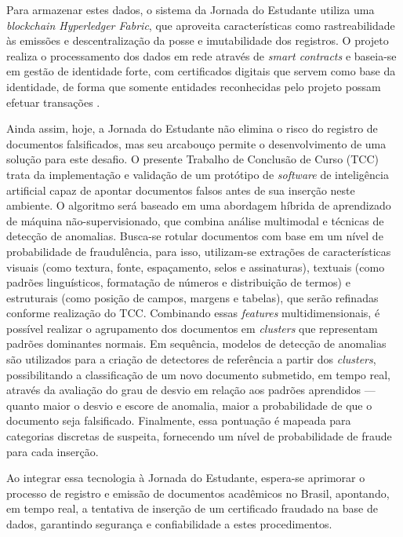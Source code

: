 Para armazenar estes dados, o sistema da Jornada do Estudante utiliza uma \textit{blockchain Hyperledger Fabric}, que aproveita características como rastreabilidade às emissões e descentralização da posse e imutabilidade dos registros. O projeto realiza o processamento dos dados em rede através de \textit{smart contracts} e baseia-se em gestão de identidade forte, com certificados digitais que servem como base da identidade, de forma que somente entidades reconhecidas pelo projeto possam efetuar transações \cite{smartcontracts,videojornada}.

Ainda assim, hoje, a Jornada do Estudante não elimina o risco do registro de documentos falsificados, mas seu arcabouço permite o desenvolvimento de uma solução para este desafio. O presente Trabalho de Conclusão de Curso (TCC) trata da implementação e validação de um protótipo de \textit{software} de inteligência artificial capaz de apontar documentos falsos antes de sua inserção neste ambiente. O algoritmo será baseado em uma abordagem híbrida de aprendizado de máquina não-supervisionado, que combina análise multimodal e técnicas de detecção de anomalias. Busca-se rotular documentos com base em um nível de probabilidade de fraudulência, para isso, utilizam-se extrações de características visuais (como textura, fonte, espaçamento, selos e assinaturas), textuais (como padrões linguísticos, formatação de números e distribuição de termos) e estruturais (como posição de campos, margens e tabelas), que serão refinadas conforme realização do TCC. Combinando essas \textit{features} multidimensionais, é possível realizar o agrupamento dos documentos em \textit{clusters} que representam padrões dominantes normais. Em sequência, modelos de detecção de anomalias são utilizados para a criação de detectores de referência a partir dos \textit{clusters}, possibilitando a classificação de um novo documento submetido, em tempo real, através da avaliação do grau de desvio em relação aos padrões aprendidos — quanto maior o desvio e escore de anomalia, maior a probabilidade de que o documento seja falsificado. Finalmente, essa pontuação é mapeada para categorias discretas de suspeita, fornecendo um nível de probabilidade de fraude para cada inserção.

Ao integrar essa tecnologia à Jornada do Estudante, espera-se aprimorar o processo de registro e emissão de documentos acadêmicos no Brasil, apontando, em tempo real, a tentativa de inserção de um certificado fraudado na base de dados, garantindo segurança e confiabilidade a estes procedimentos.

